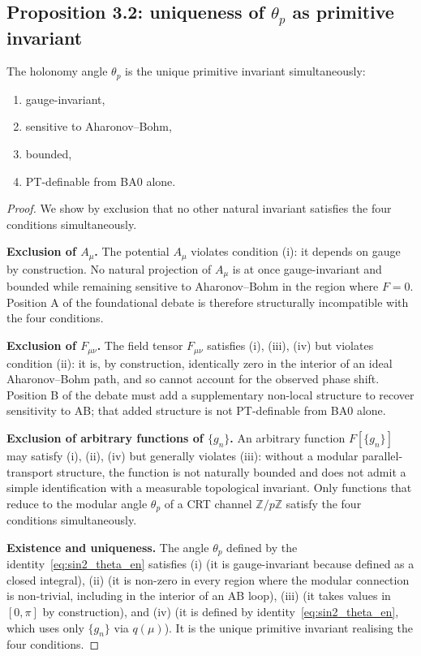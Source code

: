 \subsection{Proposition 3.2: uniqueness of $\theta_p$ as primitive invariant}
\label{ssec:prop_3_2_en}

\begin{proposition}
\label{prop:theta_p_unique_en}
The holonomy angle $\theta_p$ is the unique primitive invariant
simultaneously:
\begin{enumerate}[label=(\roman*),nosep]
  \item gauge-invariant,
  \item sensitive to Aharonov--Bohm,
  \item bounded,
  \item PT-definable from BA0 alone.
\end{enumerate}
\end{proposition}

\begin{proof}[Proof]
We show by exclusion that no other natural invariant
satisfies the four conditions simultaneously.

\textbf{Exclusion of $A_\mu$.}
The potential $A_\mu$ violates condition (i): it depends on gauge
by construction. No natural projection of $A_\mu$ is at once
gauge-invariant and bounded while remaining sensitive to
Aharonov--Bohm in the region where $F = 0$. Position A of the
foundational debate is therefore structurally incompatible with
the four conditions.

\textbf{Exclusion of $F_{\mu\nu}$.}
The field tensor $F_{\mu\nu}$ satisfies (i), (iii), (iv) but
violates condition (ii): it is, by construction, identically zero
in the interior of an ideal Aharonov--Bohm path, and so cannot
account for the observed phase shift. Position B of the debate
must add a supplementary non-local structure to recover sensitivity
to AB; that added structure is not PT-definable from BA0 alone.

\textbf{Exclusion of arbitrary functions of $\{g_n\}$.}
An arbitrary function $F[\{g_n\}]$ may satisfy (i), (ii), (iv) but
generally violates (iii): without a modular parallel-transport
structure, the function is not naturally bounded and does not
admit a simple identification with a measurable topological
invariant. Only functions that reduce to the modular angle
$\theta_p$ of a CRT channel $\mathbb{Z}/p\mathbb{Z}$ satisfy the
four conditions simultaneously.

\textbf{Existence and uniqueness.}
The angle $\theta_p$ defined by the
identity~\eqref{eq:sin2_theta_en} satisfies (i) (it is
gauge-invariant because defined as a closed integral),
(ii) (it is non-zero in every region where the modular connection
is non-trivial, including in the interior of an AB loop), (iii)
(it takes values in $[0, \pi]$ by construction), and (iv) (it is
defined by identity~\eqref{eq:sin2_theta_en}, which uses only
$\{g_n\}$ via $q(\mu)$). It is the unique primitive invariant
realising the four conditions.
\end{proof}

